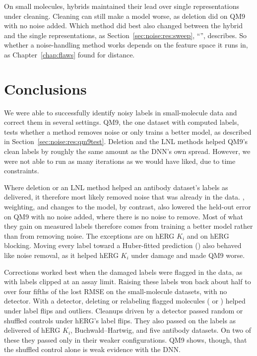 \label{sec:noise:discussion}

On small molecules, hybrids maintained their lead over single representations under cleaning. Cleaning can still make a model worse, as deletion did on QM9 with no noise added. Which method did best also changed between the hybrid and the single representations, as Section~\ref{sec:noise:res:sweep}, ``'', describes. So whether a noise-handling method works depends on the feature space it runs in, as Chapter~\ref{chap:flaws} found for distance.

\section{Conclusions}\label{sec:noise:conclusion}

We were able to successfully identify noisy labels in small-molecule data and correct them in several settings. QM9, the one dataset with computed labels, tests whether a method removes noise or only trains a better model, as described in Section~\ref{sec:noise:res:qm9test}. Deletion and the LNL methods helped QM9's clean labels by roughly the same amount as the DNN's own spread. However, we were not able to run as many iterations as we would have liked, due to time constraints. 

Where deletion or an LNL method helped an antibody dataset's labels as delivered, it therefore most likely removed noise that was already in the data. , weighting, and changes to the model, by contrast, also lowered the held-out error on QM9 with no noise added, where there is no noise to remove. Most of what they gain on measured labels therefore comes from training a better model rather than from removing noise. The exceptions are  on hERG $K_i$ and on hERG blocking. Moving every label toward a Huber-fitted prediction () also behaved like noise removal, as it helped hERG $K_i$ under damage and made QM9 worse.

Corrections worked best when the damaged labels were flagged in the data, as with labels clipped at an assay limit. Raising these labels won back about half to over four fifths of the lost RMSE on the small-molecule datasets, with no detector. With a detector, deleting or relabeling flagged molecules ( or ) helped under label flips and outliers. Cleanups driven by a detector passed random or shuffled controls under hERG's label flips. They also passed on the labels as delivered of hERG $K_i$, Buchwald--Hartwig, and five antibody datasets. On two of these they passed only in their weaker configurations. QM9 shows, though, that the shuffled control alone is weak evidence with the DNN.

